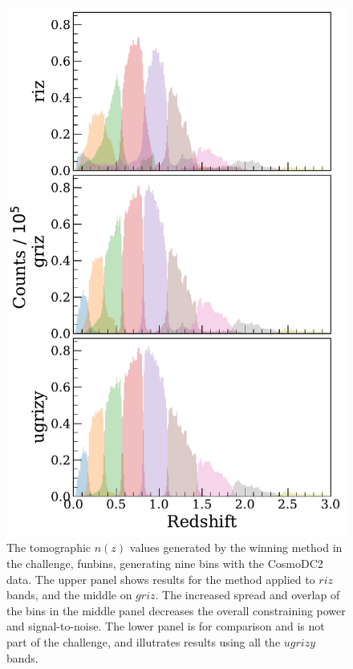 \documentclass[twocolumn,twocolappendix]{aastex63}
\begin{document}
\begin{figure}[htbp]
	\includegraphics[width=1\linewidth]{results/nzbinned_dc2_funbins.pdf}
	\caption{The tomographic $n(z)$ values generated by the winning method in the challenge, {\sc funbins},
		generating nine bins with the CosmoDC2 data.
		The upper panel shows results for the method applied to $riz$ bands, and the middle on $griz$. The
		increased spread and overlap of the bins in the middle panel decreases the overall constraining
		power and signal-to-noise.  The lower panel is for comparison and is not part of the challenge,
		and illutrates results using all the $ugrizy$ bands.}
	\label{fig:funbin_nz}
\end{figure}
\end{document}

